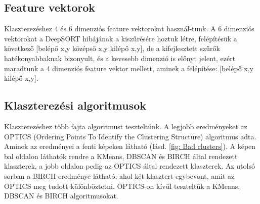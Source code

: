 \documentclass[12pt,a4paper]{article}
\begin{document}
\subsection{Feature vektorok}
Klaszterezéshez 4 és 6 dimenziós feature vektorokat használ-tunk. A 6 dimenziós vektorokat a DeepSORT hibájának a kiszűrésére hoztuk létre, felépítésük a következő [belépő x,y középső x,y kilépő x,y], de a kifejlesztett szűrők hatékonyabbaknak bizonyult, és a kevesebb dimenzió is előnyt jelent, ezért maradtunk a 4 dimenziós feature vektor mellett, aminek a felépítése: [belépő x,y kilépő x,y].
\subsection{Klaszterezési algoritmusok}
Klaszterezéshez több fajta algoritmust teszteltünk. A legjobb eredményeket az OPTICS (Ordering Points To Identify the Clustering Structure) \cite{10.1145/304181.304187} algoritmus adta.
Aminek az eredményei a fenti képeken látható (lásd. \ref{fig: Bad clusters}). A képen bal oldalon láthatók rendre a KMeans, DBSCAN és BIRCH által rendezett klaszterek, a jobb oldalon pedig az OPTICS által rendezett klaszterek. Az utolsó sorban a BIRCH eredménye látható, ahol két klasztert egybevont, amit az OPTICS meg tudott különböztetni.
OPTICS-on kívül teszteltük a KMeans, DBSCAN és BIRCH algoritmusokat.
\end{document}
